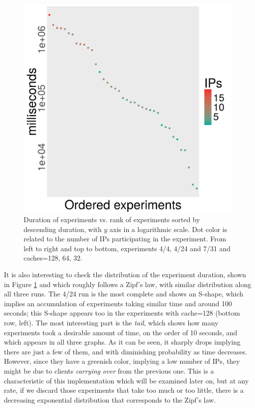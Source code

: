 \documentclass[letterpaper]{article}
\begin{document}
\begin{figure}[!htb]
\includegraphics[width=0.32\linewidth]{time-vs-rank-alife-32.png}
\caption{Duration of experiments vs. rank of experiments sorted by
  descending duration, with $y$ axis in a
  logarithmic scale. Dot color is related to the number of IPs
  participating in the experiment. From left to right and top to bottom, experiments
  4/4, 4/24 and 7/31 and caches=128, 64, 32.} 
\label{fig:zipf:os}
\end{figure}
%
It is also interesting to check the distribution of the experiment
duration, shown in Figure \ref{fig:zipf:os} and which roughly follows
a Zipf's law, with similar distribution along all three runs. The 4/24
run is the most complete and shows an S-shape, which implies an
accumulation of experiments taking similar time and around 100
seconds; this S-shape appears too in the experiments with cache=128
(bottom row, left). The most interesting part is the {\em tail}, which shows how
many experiments took a desirable amount of time, on the order of
10 seconds, and which appears in all three graphs. As it can be seen,
it sharply drops implying there are 
just a few of them, and with diminishing probability as time
decreases. However, since they have a greenish color, implying a low
number of IPs, they might be due to clients {\em carrying over} from
the previous one. This is a characteristic of this implementation
which will be examined later on, but at any rate, if we discard those
experiments that take too much or too little, there is a decreasing
exponential distribution that corresponds to the Zipf's law.
\end{document}
